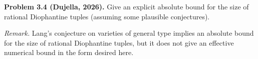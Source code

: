 \textbf{Problem 3.4 (Dujella, 2026).} Give an explicit absolute bound for the size of rational Diophantine tuples (assuming some plausible conjectures).

\medskip

\textit{Remark.} Lang's conjecture on varieties of general type implies an absolute bound for the size of rational Diophantine tuples, but it does not give an effective numerical bound in the form desired here.
